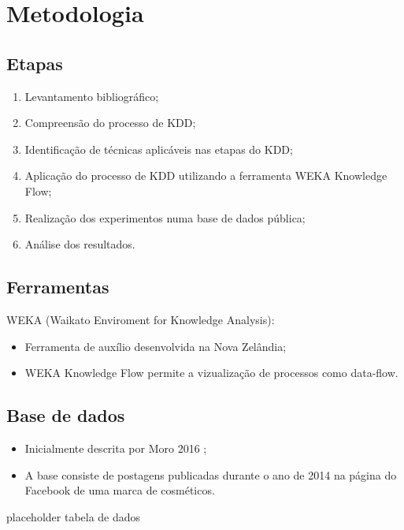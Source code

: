 \section{Metodologia}

\subsection{Etapas}
\begin{frame}
	\begin{enumerate}
		\item Levantamento bibliográfico;
		\item Compreensão do processo de KDD;
		\item Identificação de técnicas aplicáveis nas etapas do KDD;
		\item Aplicação do processo de KDD utilizando a ferramenta WEKA Knowledge Flow;
		\item Realização dos experimentos numa base de dados pública;
		\item Análise dos resultados.
	\end{enumerate}
\end{frame}

\subsection{Ferramentas}
\begin{frame}
	WEKA (Waikato Enviroment for Knowledge Analysis):
	\begin{itemize}
		\item Ferramenta de auxílio desenvolvida na Nova Zelândia;
		\item WEKA Knowledge Flow permite a vizualização de processos como data-flow.
	\end{itemize}
\end{frame}

\subsection{Base de dados}
\begin{frame}
	\begin{itemize}
		\item Inicialmente descrita por Moro 2016 \cite{moro2016};
		\item A base consiste de postagens publicadas durante o ano de 2014 na página do Facebook de uma marca de cosméticos.
	\end{itemize}

placeholder tabela de dados
\end{frame}